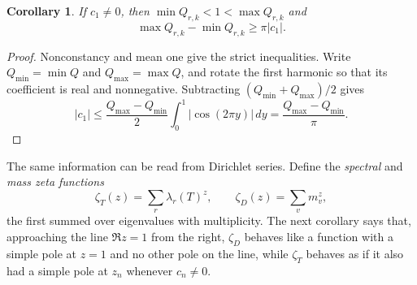 \documentclass[11pt]{article}
\newtheorem{corollary}[theorem]{Corollary}
\theoremstyle{definition}
\theoremstyle{remark}
\begin{document}
\begin{corollary}\label{cor:width}
If $c_1\ne0$, then $\min Q_{r,k}<1<\max Q_{r,k}$ and
\[
 \max Q_{r,k}-\min Q_{r,k}\ge\pi|c_1|.
\]
\end{corollary}
\begin{proof}
Nonconstancy and mean one give the strict inequalities. Write $Q_{\min}=\min Q$
and $Q_{\max}=\max Q$, and rotate the first harmonic so that its coefficient
is real and nonnegative. Subtracting $(Q_{\min}+Q_{\max})/2$ gives
\[
 |c_1|\le\frac{Q_{\max}-Q_{\min}}{2}\int_0^1|\cos(2\pi y)|\,dy
 =\frac{Q_{\max}-Q_{\min}}{\pi}.
\]
\end{proof}

The same information can be read from Dirichlet series. Define the
\emph{spectral} and \emph{mass zeta functions}
\[
 \zeta_T(z)=\sum_r\lambda_r(T)^z,\qquad \zeta_D(z)=\sum_v m_v^z,
\]
the first summed over eigenvalues with multiplicity. The next corollary
says that, approaching the line $\Re z=1$ from the right, $\zeta_D$
behaves like a function with a simple pole at $z=1$ and no other pole on
the line, while $\zeta_T$ behaves as if it also had a simple pole at
$z_n$ whenever $c_n\ne0$.
\end{document}
